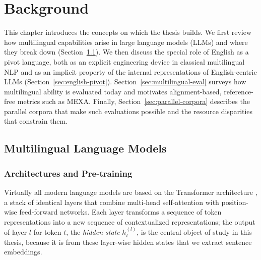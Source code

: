 \chapter{Background}
\label{ch:background}

This chapter introduces the concepts on which the thesis builds. We first
review how multilingual capabilities arise in large language models (LLMs)
and where they break down (Section~\ref{sec:multilingual-lms}). We then
discuss the special role of English as a pivot language, both as an explicit
engineering device in classical multilingual NLP and as an implicit property
of the internal representations of English-centric LLMs
(Section~\ref{sec:english-pivot}). Section~\ref{sec:multilingual-eval}
surveys how multilingual ability is evaluated today and motivates
alignment-based, reference-free metrics such as MEXA. Finally,
Section~\ref{sec:parallel-corpora} describes the parallel corpora that make
such evaluations possible and the resource disparities that constrain them.

\section{Multilingual Language Models}
\label{sec:multilingual-lms}

\subsection{Architectures and Pre-training}
\label{subsec:architectures}

Virtually all modern language models are based on the Transformer
architecture \citep{vaswani2017attention}, a stack of identical layers that
combine multi-head self-attention with position-wise feed-forward networks.
Each layer transforms a sequence of token representations into a new
sequence of contextualized representations; the output of layer $l$ for
token $t$, the \emph{hidden state} $h_t^{(l)}$, is the central object of
study in this thesis, because it is from these layer-wise hidden states
that we extract sentence embeddings.

